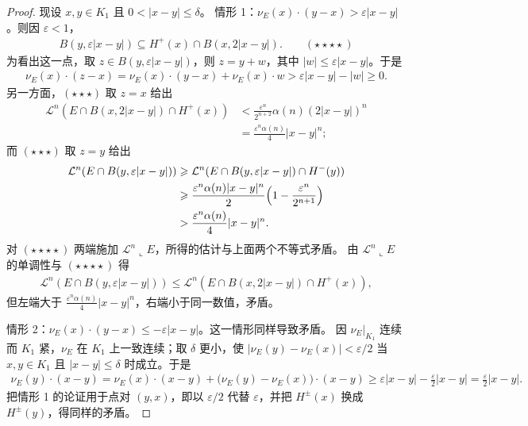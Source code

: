 \documentclass[../../main.tex]{subfiles}%
\begin{document}
\begin{proof}
现设 $x,y\in K_1$ 且 $0<\lvert x-y\rvert\leqslant\delta$。
情形 1：$\nu_E(x)\cdot(y-x)>\varepsilon\lvert x-y\rvert$。则因 $\varepsilon<1$，
\begin{align*}
B(y,\varepsilon\lvert x-y\rvert)\subseteq H^+(x)\cap B(x,2\lvert x-y\rvert).\qquad(\star\star\star\star)
\end{align*}
为看出这一点，取 $z\in B(y,\varepsilon\lvert x-y\rvert)$，则 $z=y+w$，其中 $\lvert w\rvert\leqslant\varepsilon\lvert x-y\rvert$。于是
\begin{align*}
\nu_E(x)\cdot(z-x)=\nu_E(x)\cdot(y-x)+\nu_E(x)\cdot w>\varepsilon\lvert x-y\rvert-\lvert w\rvert\geqslant0 .
\end{align*}
另一方面，$(\star\star\star)$ 取 $z=x$ 给出
\begin{align*}
\mathcal{L}^n(E\cap B(x,2\lvert x-y\rvert)\cap H^+(x))
&<\frac{\varepsilon^n}{2^{n+2}}\alpha(n)(2\lvert x-y\rvert)^n\\
&=\frac{\varepsilon^n\alpha(n)}{4}\lvert x-y\rvert^n ;
\end{align*}
而 $(\star\star\star)$ 取 $z=y$ 给出
\begin{align*}
\mathcal{L}^n(E\cap B(y,\varepsilon\lvert x-y\rvert))
&\geqslant\mathcal{L}^n(E\cap B(y,\varepsilon\lvert x-y\rvert)\cap H^-(y))\\
&\geqslant\frac{\varepsilon^n\alpha(n)\lvert x-y\rvert^n}{2}\Bigl(1-\frac{\varepsilon^n}{2^{n+1}}\Bigr)\\
&>\frac{\varepsilon^n\alpha(n)}{4}\lvert x-y\rvert^n .
\end{align*}
对 $(\star\star\star\star)$ 两端施加 $\mathcal{L}^n\llcorner E$，所得的估计与上面两个不等式矛盾。
由 $\mathcal{L}^n\llcorner E$ 的单调性与 $(\star\star\star\star)$ 得
\begin{align*}
\mathcal{L}^n(E\cap B(y,\varepsilon\lvert x-y\rvert))\leqslant\mathcal{L}^n(E\cap B(x,2\lvert x-y\rvert)\cap H^+(x)),
\end{align*}
但左端大于 $\frac{\varepsilon^n\alpha(n)}{4}\lvert x-y\rvert^n$，右端小于同一数值，矛盾。

情形 2：$\nu_E(x)\cdot(y-x)\leqslant-\varepsilon\lvert x-y\rvert$。这一情形同样导致矛盾。
因 $\nu_E|_{K_1}$ 连续而 $K_1$ 紧，$\nu_E$ 在 $K_1$ 上一致连续；取 $\delta$ 更小，使 $\lvert\nu_E(y)-\nu_E(x)\rvert<\varepsilon/2$ 当 $x,y\in K_1$ 且 $\lvert x-y\rvert\leqslant\delta$ 时成立。于是
\begin{align*}
\nu_E(y)\cdot(x-y)=\nu_E(x)\cdot(x-y)+\bigl(\nu_E(y)-\nu_E(x)\bigr)\cdot(x-y)\geqslant\varepsilon\lvert x-y\rvert-\frac{\varepsilon}{2}\lvert x-y\rvert=\frac{\varepsilon}{2}\lvert x-y\rvert .
\end{align*}
把情形 1 的论证用于点对 $(y,x)$，即以 $\varepsilon/2$ 代替 $\varepsilon$，并把 $H^{\pm}(x)$ 换成 $H^{\pm}(y)$，得同样的矛盾。


\end{proof}
\end{document}
